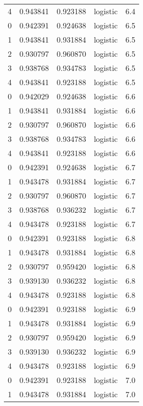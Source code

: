 \begin{tabular}{rrrlr}
     4 & 0.943841 & 0.923188 & logistic &        6.4 \\
     0 & 0.942391 & 0.924638 & logistic &        6.5 \\
     1 & 0.943841 & 0.931884 & logistic &        6.5 \\
     2 & 0.930797 & 0.960870 & logistic &        6.5 \\
     3 & 0.938768 & 0.934783 & logistic &        6.5 \\
     4 & 0.943841 & 0.923188 & logistic &        6.5 \\
     0 & 0.942029 & 0.924638 & logistic &        6.6 \\
     1 & 0.943841 & 0.931884 & logistic &        6.6 \\
     2 & 0.930797 & 0.960870 & logistic &        6.6 \\
     3 & 0.938768 & 0.934783 & logistic &        6.6 \\
     4 & 0.943841 & 0.923188 & logistic &        6.6 \\
     0 & 0.942391 & 0.924638 & logistic &        6.7 \\
     1 & 0.943478 & 0.931884 & logistic &        6.7 \\
     2 & 0.930797 & 0.960870 & logistic &        6.7 \\
     3 & 0.938768 & 0.936232 & logistic &        6.7 \\
     4 & 0.943478 & 0.923188 & logistic &        6.7 \\
     0 & 0.942391 & 0.923188 & logistic &        6.8 \\
     1 & 0.943478 & 0.931884 & logistic &        6.8 \\
     2 & 0.930797 & 0.959420 & logistic &        6.8 \\
     3 & 0.939130 & 0.936232 & logistic &        6.8 \\
     4 & 0.943478 & 0.923188 & logistic &        6.8 \\
     0 & 0.942391 & 0.923188 & logistic &        6.9 \\
     1 & 0.943478 & 0.931884 & logistic &        6.9 \\
     2 & 0.930797 & 0.959420 & logistic &        6.9 \\
     3 & 0.939130 & 0.936232 & logistic &        6.9 \\
     4 & 0.943478 & 0.923188 & logistic &        6.9 \\
     0 & 0.942391 & 0.923188 & logistic &        7.0 \\
     1 & 0.943478 & 0.931884 & logistic &        7.0 \\

\end{tabular}
